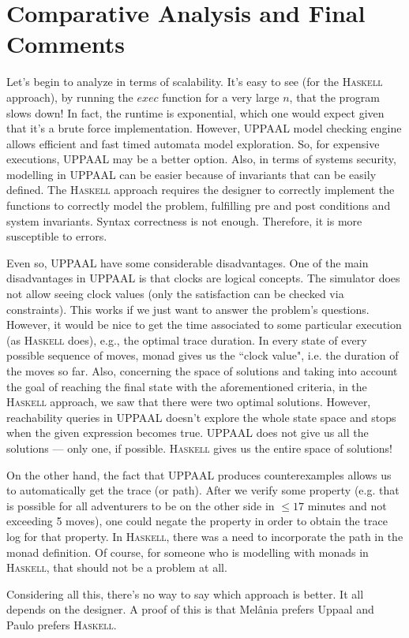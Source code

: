 \documentclass[a4paper]{article}
\def\aspas#1{``#1"}
\newcommand{\Varid}[1]{\mathit{#1}}
\renewcommand{\leq}{\leqslant}
\begin{document}
\section{Comparative Analysis and Final Comments}

Let's begin to analyze in terms of scalability. It's easy to see (for the \textsc{Haskell} approach), by running the \ensuremath{\Varid{exec}} function for a very large \ensuremath{\Varid{n}}, that the program slows down! In fact, the runtime is exponential, which one would expect given that it's a brute force implementation. However, UPPAAL model checking engine allows efficient and fast timed automata model exploration. So, for expensive executions, UPPAAL may be a better option. Also, in terms of systems security, modelling in UPPAAL can be easier because of invariants that can be easily defined. The \textsc{Haskell} approach requires the designer to correctly implement the functions to correctly model the problem, fulfilling pre and post conditions and system invariants. Syntax correctness is not enough. Therefore, it is more susceptible to errors.

Even so, UPPAAL have some considerable disadvantages. One of the main disadvantages in UPPAAL is that clocks are logical concepts. The simulator does not allow seeing clock values (only the satisfaction can be checked via constraints). This works if we just want to answer the problem's questions. However, it would be nice to get the time associated to some particular execution (as \textsc{Haskell} does), e.g., the optimal trace duration. In every state of every possible sequence of moves, monad gives us the \aspas{clock value}, i.e. the duration of the moves so far. Also, concerning the space of solutions and taking into account the goal of reaching the final state with the aforementioned criteria, in the \textsc{Haskell} approach, we saw that there were two optimal solutions. However, reachability queries in UPPAAL doesn’t explore the whole state space and stops   
when the given expression becomes true. UPPAAL does not give us all the solutions --- only one, if possible. \textsc{Haskell} gives us the entire space of solutions!

On the other hand, the fact that UPPAAL produces counterexamples allows us to automatically get the trace (or path). After we verify some property (e.g. that is possible for all adventurers to be on the other side in \ensuremath{\leq \mathrm{17}} minutes and not exceeding 5 moves), one could negate the property in order to obtain the trace log for that property. In \textsc{Haskell}, there was a need to incorporate the path in the monad definition. Of course, for someone who is modelling with monads in \textsc{Haskell}, that should not be a problem at all.

Considering all this, there's no way to say which approach is better. It all depends on the designer.
A proof of this is that Melânia prefers Uppaal and Paulo prefers \textsc{Haskell}.
\end{document}
